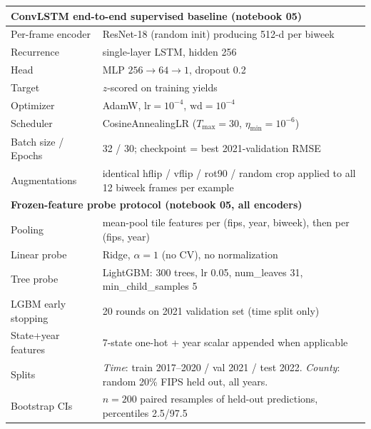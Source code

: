 \begin{table}[H]
\begin{tabular}{p{5.5cm}p{8.5cm}}
\midrule
\multicolumn{2}{l}{\textbf{ConvLSTM end-to-end supervised baseline (notebook 05)}} \\
\midrule
Per-frame encoder & ResNet-18 (random init) producing 512-d per biweek \\
Recurrence & single-layer LSTM, hidden 256 \\
Head & MLP $256 \to 64 \to 1$, dropout 0.2 \\
Target & $z$-scored on training yields \\
Optimizer & AdamW, $\mathrm{lr}=10^{-4}$, $\mathrm{wd}=10^{-4}$ \\
Scheduler & CosineAnnealingLR ($T_\mathrm{max}=30$, $\eta_\mathrm{min}=10^{-6}$) \\
Batch size / Epochs & 32 / 30; checkpoint = best 2021-validation RMSE \\
Augmentations & identical hflip / vflip / rot90 / random crop applied to all 12 biweek frames per example \\
\midrule
\multicolumn{2}{l}{\textbf{Frozen-feature probe protocol (notebook 05, all encoders)}} \\
\midrule
Pooling & mean-pool tile features per (fips, year, biweek), then per (fips, year) \\
Linear probe & Ridge, $\alpha\!=\!1$ (no CV), no normalization \\
Tree probe & LightGBM: 300 trees, lr 0.05, num\_leaves 31, min\_child\_samples 5 \\
LGBM early stopping & 20 rounds on 2021 validation set (time split only) \\
State+year features & 7-state one-hot + year scalar appended when applicable \\
Splits & \textit{Time}: train 2017--2020 / val 2021 / test 2022. \textit{County}: random 20\% FIPS held out, all years. \\
Bootstrap CIs & $n=200$ paired resamples of held-out predictions, percentiles 2.5/97.5 \\
\bottomrule
\end{tabular}
\end{table}
